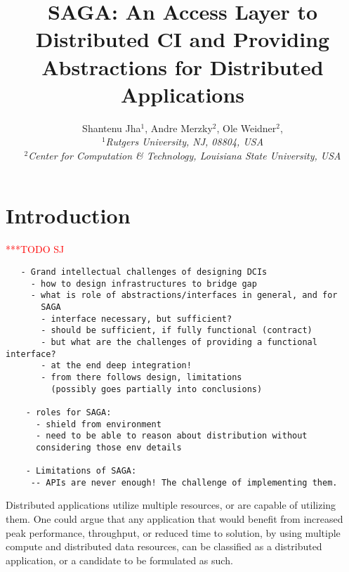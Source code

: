 \documentclass[a4paper,12pt]{article}
\newif\ifdraft
\newcommand{\todo}[1]{     {\textcolor{red}  { ***TODO      #1 }}}
\newcommand{\todo}[1]{}
\begin{document}
\title{ \large \vspace{-3.5em} SAGA: An Access Layer to Distributed CI
  and Providing Abstractions for Distributed Applications}


\author{\normalsize Shantenu Jha$^{1}$, Andre Merzky$^{2}$, Ole
  Weidner$^{2}$, \\ \small{\emph{$^{1}$Rutgers University, NJ, 08804,
      USA}}\\ \small{\emph{$^{2}$Center for Computation \& Technology,
      Louisiana State University, USA}}\\ } \date{}
 \maketitle

\ifdraft
 \tableofcontents
\fi

 
% 
\section{Introduction}\todo{SJ}
 \label{intro}

\begin{verbatim}
   - Grand intellectual challenges of designing DCIs
     - how to design infrastructures to bridge gap
     - what is role of abstractions/interfaces in general, and for
       SAGA
       - interface necessary, but sufficient?
       - should be sufficient, if fully functional (contract)
       - but what are the challenges of providing a functional interface?
       - at the end deep integration!
       - from there follows design, limitations
         (possibly goes partially into conclusions)

    - roles for SAGA: 
      - shield from environment
      - need to be able to reason about distribution without
      considering those env details

    - Limitations of SAGA:
     -- APIs are never enough! The challenge of implementing them. 

\end{verbatim}

Distributed applications utilize multiple resources, or are capable of
utilizing them. One could argue that any application that would
benefit from increased peak performance, throughput, or reduced time
to solution, by using multiple compute and distributed data resources,
can be classified as a distributed application, or a candidate to be
formulated as such.
\end{document}
